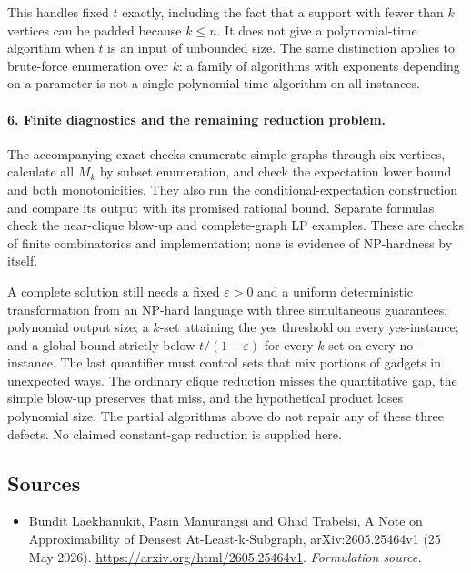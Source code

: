 \documentclass[11pt]{article}
\begin{document}
This handles fixed $t$ exactly, including the fact that a support with fewer than $k$ vertices can be padded because $k\le n$. It does not give a polynomial-time algorithm when $t$ is an input of unbounded size. The same distinction applies to brute-force enumeration over $k$: a family of algorithms with exponents depending on a parameter is not a single polynomial-time algorithm on all instances.

\paragraph{6. Finite diagnostics and the remaining reduction problem.}
The accompanying exact checks enumerate simple graphs through six vertices, calculate all $M_k$ by subset enumeration, and check the expectation lower bound and both monotonicities. They also run the conditional-expectation construction and compare its output with its promised rational bound. Separate formulas check the near-clique blow-up and complete-graph LP examples. These are checks of finite combinatorics and implementation; none is evidence of NP-hardness by itself.

A complete solution still needs a fixed $\varepsilon>0$ and a uniform deterministic transformation from an NP-hard language with three simultaneous guarantees: polynomial output size; a $k$-set attaining the yes threshold on every yes-instance; and a global bound strictly below $t/(1+\varepsilon)$ for every $k$-set on every no-instance. The last quantifier must control sets that mix portions of gadgets in unexpected ways. The ordinary clique reduction misses the quantitative gap, the simple blow-up preserves that miss, and the hypothetical product loses polynomial size. The partial algorithms above do not repair any of these three defects. No claimed constant-gap reduction is supplied here.

\subsection{Sources}
\begin{itemize}
\item[S1]Bundit Laekhanukit, Pasin Manurangsi and Ohad Trabelsi, A Note on Approximability of Densest At-Least-k-Subgraph, arXiv:2605.25464v1 (25 May 2026).
\url{https://arxiv.org/html/2605.25464v1}.
\textit{Formulation source.}
\end{itemize}
\end{document}

